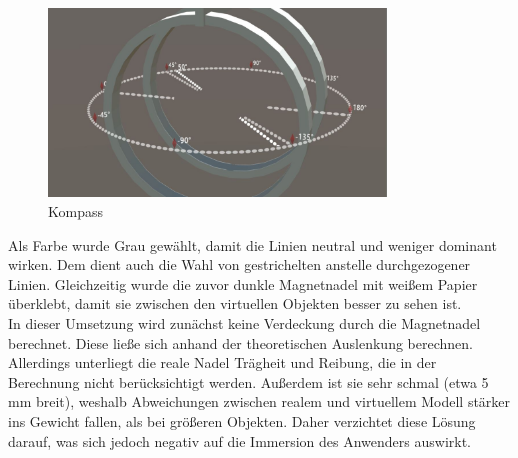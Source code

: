 \begin{figure}[H]
	\centering
	\includegraphics[width=0.8\textwidth]{images/compass.jpg}
	\caption{Kompass}
	\label{img:compass}
\end{figure}

Als Farbe wurde Grau gewählt, damit die Linien neutral und weniger dominant wirken. Dem dient auch die Wahl von gestrichelten anstelle durchgezogener Linien. Gleichzeitig wurde die zuvor dunkle Magnetnadel mit weißem Papier überklebt, damit sie zwischen den virtuellen Objekten besser zu sehen ist.\\

In dieser Umsetzung wird zunächst keine Verdeckung durch die Magnetnadel berechnet. Diese ließe sich anhand der theoretischen Auslenkung berechnen. Allerdings unterliegt die reale Nadel Trägheit und Reibung, die in der Berechnung nicht berücksichtigt werden. Außerdem ist sie sehr schmal (etwa 5 mm breit), weshalb Abweichungen zwischen realem und virtuellem Modell stärker ins Gewicht fallen, als bei größeren Objekten. Daher verzichtet diese Lösung darauf, was sich jedoch negativ auf die Immersion des Anwenders auswirkt.\\

